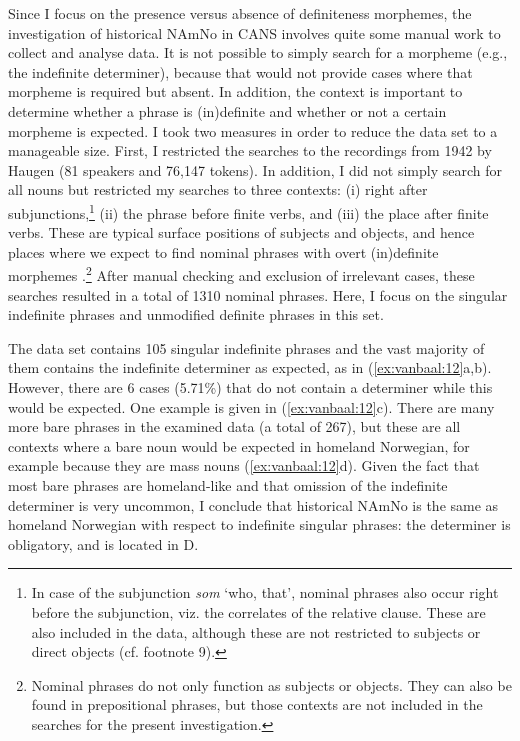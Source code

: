 \documentclass[output=paper]{langscibook}
\begin{document}
Since I focus on the presence versus absence of definiteness morphemes, the investigation of historical NAmNo in CANS involves quite some manual work to collect and analyse data. It is not possible to simply search for a morpheme (e.g., the indefinite determiner), because that would not provide cases where that morpheme is required but absent. In addition, the context is important to determine whether a phrase is (in)definite and whether or not a certain morpheme is expected. I took two measures in order to reduce the data set to a manageable size. First, I restricted the searches to the recordings from 1942 by Haugen (81 speakers and 76,147 tokens). In addition, I did not simply search for all nouns but restricted my searches to three contexts: (i) right after subjunctions,\footnote{In case of the subjunction \textit{som} `who, that', nominal phrases also occur right before the subjunction, viz. the correlates of the relative clause. These are also included in the data, although these are not restricted to subjects or direct objects (cf. footnote 9).} (ii) the phrase before finite verbs, and (iii) the place after finite verbs. These are typical surface positions of subjects and objects, and hence places where we expect to find nominal phrases with overt (in)definite morphemes \citep[e.g.,][]{Longobardi2010}.\footnote{Nominal phrases do not only function as subjects or objects. They can also be found in prepositional phrases, but those contexts are not included in the searches for the present investigation.} After manual checking and exclusion of irrelevant cases, these searches resulted in a total of 1310 nominal phrases. Here, I focus on the singular indefinite phrases and unmodified definite phrases in this set.
 
The data set contains 105 singular indefinite phrases and the vast majority of them contains the indefinite determiner as expected, as in (\ref{ex:vanbaal:12}a,b). However, there are 6 cases (5.71\%) that do not contain a determiner while this would be expected. One example is given in (\ref{ex:vanbaal:12}c). There are many more bare phrases in the examined data (a total of 267), but these are all contexts where a bare noun would be expected in homeland Norwegian, for example because they are mass nouns (\ref{ex:vanbaal:12}d). Given the fact that most bare phrases are homeland\hyp like and that omission of the indefinite determiner is very uncommon, I conclude that historical NAmNo is the same as homeland Norwegian with respect to indefinite singular phrases: the determiner is obligatory, and is located in D.
 
\end{document}
